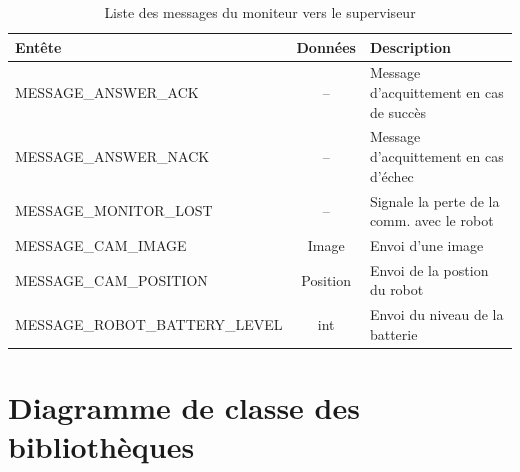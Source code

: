 \begin{appendices}
\begin{table}[htp]
\begin{center}
\begin{tabular}{lcl}
\hline
Entête & Données & Description\\
\hline
\hline
MESSAGE\_ANSWER\_ACK & -- & Message d'acquittement en cas de succès\\
MESSAGE\_ANSWER\_NACK & -- & Message d'acquittement en cas d'échec\\
MESSAGE\_MONITOR\_LOST  & -- & Signale la perte de la comm. avec le robot\\
MESSAGE\_CAM\_IMAGE  & Image & Envoi d'une image\\
MESSAGE\_CAM\_POSITION & Position & Envoi de la postion du robot\\
MESSAGE\_ROBOT\_BATTERY\_LEVEL  & int & Envoi du niveau de la batterie\\
\hline
\end{tabular}
\end{center}
\caption{Liste des messages du moniteur vers le superviseur}
\label{tab:stm}
\end{table}%
\FloatBarrier

\newpage
\section{Diagramme de classe des bibliothèques}
\label{ann:diag_class}


\end{appendices}
